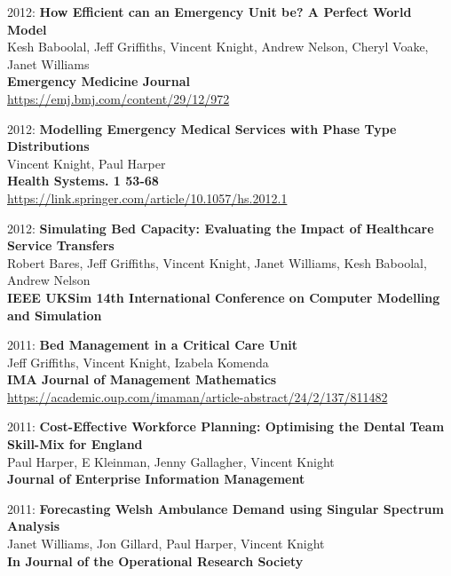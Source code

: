\documentclass[10pt]{article}
\begin{document}
\begin{etaremune}
\item
  2012: \textbf{How Efficient can an Emergency Unit be? A Perfect World Model}\\
  Kesh Baboolal, Jeff Griffiths, Vincent Knight, Andrew Nelson, Cheryl Voake, Janet Williams\\
  \textbf{Emergency Medicine Journal}\\
  \url{https://emj.bmj.com/content/29/12/972}\\
  

\item
  2012: \textbf{Modelling Emergency Medical Services with Phase Type Distributions}\\
  Vincent Knight, Paul Harper\\
  \textbf{Health Systems. 1 53-68}\\
  \url{https://link.springer.com/article/10.1057/hs.2012.1}\\
  

\item
  2012: \textbf{Simulating Bed Capacity: Evaluating the Impact of Healthcare Service Transfers}\\
  Robert Bares, Jeff Griffiths, Vincent Knight, Janet Williams, Kesh Baboolal, Andrew Nelson\\
  \textbf{IEEE UKSim 14th International Conference on Computer Modelling and Simulation}\\
  
  

\item
  2011: \textbf{Bed Management in a Critical Care Unit}\\
  Jeff Griffiths, Vincent Knight, Izabela Komenda\\
  \textbf{IMA Journal of Management Mathematics}\\
  \url{https://academic.oup.com/imaman/article-abstract/24/2/137/811482}\\
  

\item
  2011: \textbf{Cost-Effective Workforce Planning: Optimising the Dental Team Skill-Mix for England}\\
  Paul Harper, E Kleinman, Jenny Gallagher, Vincent Knight\\
  \textbf{Journal of Enterprise Information Management}\\
  
  

\item
  2011: \textbf{Forecasting Welsh Ambulance Demand using Singular Spectrum Analysis}\\
  Janet Williams, Jon Gillard, Paul Harper, Vincent Knight\\
  \textbf{In Journal of the Operational Research Society}\\
  

\end{etaremune}
\end{document}
